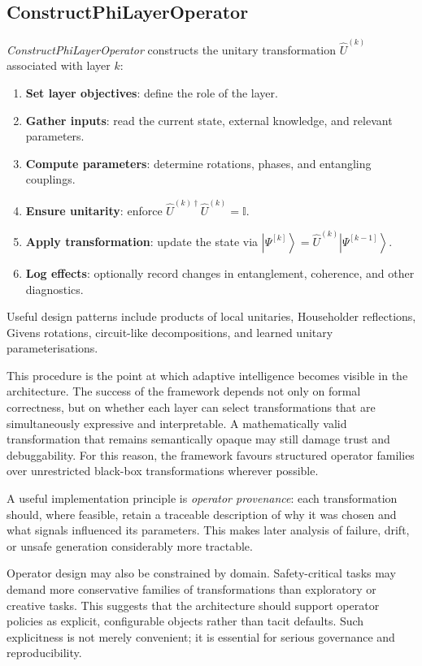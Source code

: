 \documentclass[12pt]{article}
\newcommand{\ket}[1]{\left|#1\right\rangle}
\newcommand{\I}{\mathbb{I}}
\begin{document}
\subsection{ConstructPhiLayerOperator}
\textit{ConstructPhiLayerOperator} constructs the unitary transformation $\hat{U}^{(k)}$ associated with layer $k$:
\begin{enumerate}[leftmargin=2em]
    \item \textbf{Set layer objectives}: define the role of the layer.
    \item \textbf{Gather inputs}: read the current state, external knowledge, and relevant parameters.
    \item \textbf{Compute parameters}: determine rotations, phases, and entangling couplings.
    \item \textbf{Ensure unitarity}: enforce $\hat{U}^{(k)\dagger}\hat{U}^{(k)} = \I$.
    \item \textbf{Apply transformation}: update the state via $\ket{\Psi^{[k]}} = \hat{U}^{(k)}\ket{\Psi^{[k-1]}}$.
    \item \textbf{Log effects}: optionally record changes in entanglement, coherence, and other diagnostics.
\end{enumerate}
Useful design patterns include products of local unitaries, Householder reflections, Givens rotations, circuit-like decompositions, and learned unitary parameterisations.

This procedure is the point at which adaptive intelligence becomes visible in the architecture. The success of the framework depends not only on formal correctness, but on whether each layer can select transformations that are simultaneously expressive and interpretable. A mathematically valid transformation that remains semantically opaque may still damage trust and debuggability. For this reason, the framework favours structured operator families over unrestricted black-box transformations wherever possible.

A useful implementation principle is \emph{operator provenance}: each transformation should, where feasible, retain a traceable description of why it was chosen and what signals influenced its parameters. This makes later analysis of failure, drift, or unsafe generation considerably more tractable.

Operator design may also be constrained by domain. Safety-critical tasks may demand more conservative families of transformations than exploratory or creative tasks. This suggests that the architecture should support operator policies as explicit, configurable objects rather than tacit defaults. Such explicitness is not merely convenient; it is essential for serious governance and reproducibility.
\end{document}
